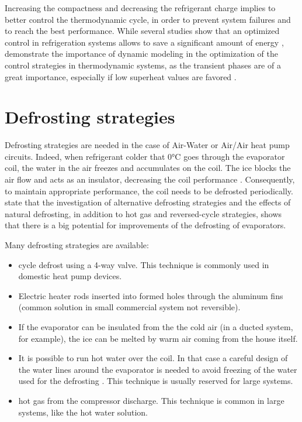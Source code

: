 Increasing the compactness and decreasing the refrigerant charge
implies to better control the thermodynamic cycle, in order to prevent
system failures and to reach the best performance. While several
studies show that an optimized control in refrigeration systems allows
to save a significant amount of energy
\citep{jakobsen-rasmussen-1998a,abdelghaniidrissi-richalet-2001a,yao-zhou-2004a,leducq-trystram-2006a},
\citet{Fallahsohi-LinShi-2010a} demonstrate the importance of dynamic
modeling in the optimization of the control strategies in
thermodynamic systems, as the transient phases are of a great
importance, especially if low superheat values are favored
\citep{TamainotTelto-1993a,TamainotTelto-Lallemand-1996a,lin-yeh-2007a,nanayakkara-uehara-2002a}.

\section{Defrosting strategies}
\label{sec:defrosting-art}

Defrosting strategies are needed in the case of Air-Water or Air/Air
heat pump circuits. Indeed, when refrigerant colder that 0°C goes
through the evaporator coil, the water in the air freezes and
accumulates on the coil. The ice blocks the air flow and acts as an
insulator, decreasing the coil performance
\citep[p.\,169]{dincer-kanoglu-2010a}. Consequently, to maintain
appropriate performance, the coil needs to be defrosted
periodically. \citet[p.\,4]{bertsch-hubacher-2002a} state that the
investigation of alternative defrosting strategies and the effects of
natural defrosting, in addition to hot gas and reversed-cycle
strategies, shows that there is a big potential for improvements of
the defrosting of evaporators.

Many defrosting strategies are available:

\begin{itemize}
\item cycle defrost using a 4-way valve. This technique is commonly
  used in domestic heat pump devices.
\item Electric heater rods inserted into formed holes through the
  aluminum fins (common solution in small commercial system not
  reversible).
\item If the evaporator can be insulated from the the cold air (in a
  ducted system, for example), the ice can be melted by warm air
  coming from the house itself.
\item It is possible to run hot water over the coil. In that case a
  careful design of the water lines around the evaporator is needed to
  avoid freezing of the water used for the defrosting
  \citep[p.\,169]{dincer-kanoglu-2010a}. This technique is usually
  reserved for large systems.
\item hot gas from the compressor discharge. This technique is common
  in large systems, like the hot water solution.
\end{itemize}

